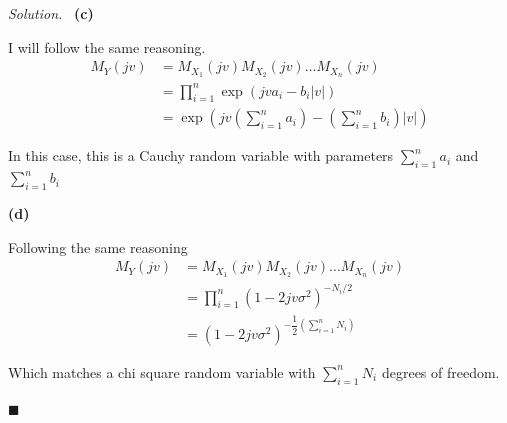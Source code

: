 \documentclass[11pt]{article}
\newenvironment{solution}
{\par\medskip\noindent\textit{Solution.}\ }
{\hfill$\blacksquare$\par\medskip}
\begin{document}
\begin{solution}
        \vspace{1em}
        \textbf{(c)}

        I will follow the same reasoning.
        \begin{align*}
            M_Y(jv) &= M_{X_1}(jv)M_{X_2}(jv) \ldots M_{X_n}(jv) \\
            &= \prod_{i=1}^{n} \exp{\left( jva_i - b_i |v| \right)} \\
            &= \exp{\left( jv (\sum_{i = 1}^{n} a_i) - (\sum_{i = 1}^{n} b_i) |v| \right)}
        \end{align*}

        In this case, this is a Cauchy random variable with parameters $\sum_{i = 1}^{n} a_i$ and $\sum_{i = 1}^{n} b_i$

        \vspace{1em}
        \textbf{(d)}

        Following the same reasoning
        \begin{align*}
            M_Y(jv) &= M_{X_1}(jv)M_{X_2}(jv) \ldots M_{X_n}(jv) \\
            &= \prod_{i=1}^{n}\left( 1 - 2jv \sigma^2 \right)^{-N_i/2} \\
            &= \left( 1 - 2jv \sigma^2 \right)^{-\dfrac{1}{2}(\sum_{i = 1}^{n} N_i) }
        \end{align*}

        Which matches a chi square random variable with $\sum_{i = 1}^{n} N_i$ degrees of freedom.

    \end{solution}
\end{document}
